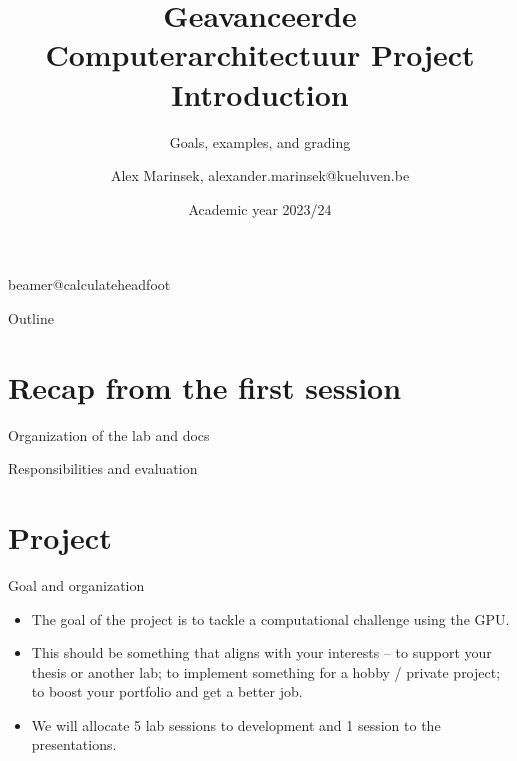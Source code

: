 \documentclass[11pt,t]{beamer}
\title[Geavanceerde Computerarchitectuur Project Introduction]{Geavanceerde Computerarchitectuur Project Introduction} %
\subtitle{Goals, examples, and grading}
\author{Alex Marinsek, {\footnotesize alexander.marinsek@kueluven.be}}
\institute{DRAMCO -- WaveCore -- ESAT}
\date{Academic year 2023/24}
\begin{document}
\csname beamer@calculateheadfoot\endcsname %


\begin{frame}
	\titlepage
\end{frame}
	

\begin{frame}{Outline}
	\hfill	{\large \parbox{.961\textwidth}{\tableofcontents[hideothersubsections]}}
\end{frame}







\section{Recap from the first session}

\begin{frame}{Organization of the lab and docs} 
    \begin{figure}[t]
        \centering
        \begin{center}               
            \resizebox{0.98\columnwidth}{!}{}
        \end{center}
    \end{figure}
\end{frame}

\begin{frame}{Responsibilities and evaluation} 
    \begin{figure}[t]
        \centering
        \begin{center}               
            \resizebox{0.98\columnwidth}{!}{}
        \end{center}
    \end{figure}
\end{frame}


\section{Project}


\begin{frame}{Goal and organization} 

\begin{itemize}\setlength\itemsep{0.5em}
\item The goal of the project is to tackle a computational challenge using the GPU.
\item This should be something that aligns with your interests -- to support your thesis or another lab; to implement something for a hobby / private project; to boost your portfolio and get a better job.
\item We will allocate 5 lab sessions to development and 1 session to the presentations.
\end{itemize}

\end{frame}
\end{document}
